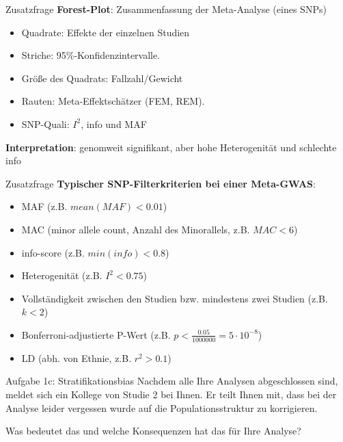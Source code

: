 \documentclass{beamer}
\begin{document}
\begin{frame}{Zusatzfrage}
    \textbf{Forest-Plot}: Zusammenfassung der Meta-Analyse (eines SNPs)

    \begin{itemize}
        \item Quadrate: Effekte der einzelnen Studien
        \item Striche: 95\%-Konfidenzintervalle. 
        \item Größe des Quadrats: Fallzahl/Gewicht
        \item Rauten: Meta-Effektschätzer (FEM, REM).
        \item SNP-Quali: $I^2$, info und MAF 
    \end{itemize}

    \textbf{Interpretation}: genomweit signifikant, aber hohe Heterogenität und schlechte info

\end{frame}

\begin{frame}{Zusatzfrage}
    \textbf{Typischer SNP-Filterkriterien bei einer Meta-GWAS}: 
    
    \begin{itemize}
        \item MAF (z.B. $mean(MAF)<0.01$)
        \item MAC (minor allele count, Anzahl des Minorallels, z.B. $MAC<6$)
        \item info-score (z.B. $min(info)<0.8$)
        \item Heterogenität (z.B. $I^2<0.75$) 
        \item Vollständigkeit zwischen den Studien bzw. mindestens zwei Studien (z.B. $k<2$)
        \item Bonferroni-adjustierte P-Wert (z.B. $p< \frac{0.05}{1000000} = 5 \cdot 10^{-8}$)
        \item LD (abh. von Ethnie, z.B. $r^2>0.1$)
    \end{itemize}

\end{frame}

\begin{frame}{Aufgabe 1c: Stratifikationsbias}
Nachdem alle Ihre Analysen abgeschlossen sind, meldet sich ein Kollege von Studie 2 bei Ihnen. Er teilt Ihnen mit, dass bei der Analyse leider vergessen wurde auf die Populationsstruktur zu korrigieren. 

Was bedeutet das und welche Konsequenzen hat das für Ihre Analyse? 

\end{frame}
\end{document}
